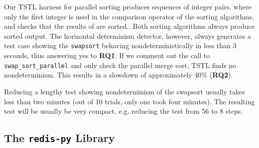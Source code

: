 {

Our TSTL harness for parallel sorting produces sequences of
integer pairs, where only the first integer is used in the comparison
operator of the sorting algorithms, and checks that the results of
are sorted..
Both sorting algorithms always produce sorted output.  The
horizontal determinism detector, however, always generates a 
test case showing the {\tt swapsort} behaving nondeterministically in
less than 3 seconds, thus
answering yes to {\bf  RQ1}.  If we comment out the call to {\tt
  swap\_sort\_parallel} and only check the parallel merge sort, TSTL
finds no nondeterminism.  This results in a slowdown of approximately
40\% ({\bf RQ2}).

Reducing a lengthy test showing nondeterminism of the swapsort usually takes less than two
minutes (out of 10 trials, only one took four minutes).  The resulting test will be usually be very compact, e.g.
reducing the test from 56 to 8 steps.

\subsection {The {\tt redis-py} Library}


}
